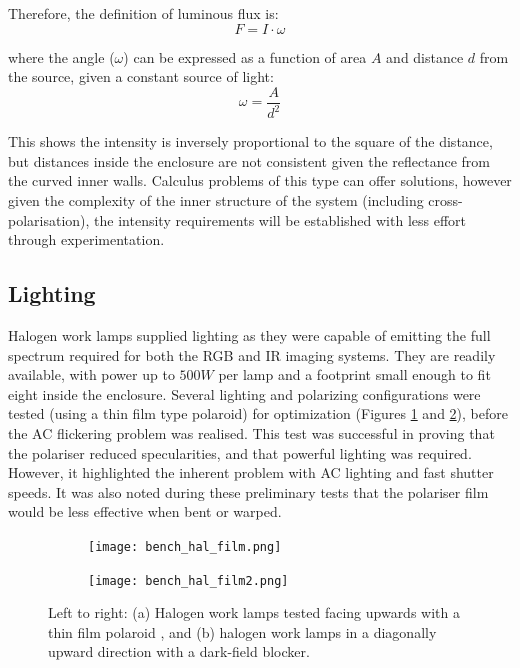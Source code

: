 \documentclass[fleqn,twoside,12pt]{report}
\begin{document}
Therefore, the definition of luminous flux is:
\begin{equation}
	F = I\cdot\omega
\end{equation}

where the angle ($\omega$) can be expressed as a function of area $A$ and distance $d$ from the source, given a constant source of light:
\begin{equation}
	\omega = \frac{A}{d^2}
\end{equation}

This shows the intensity is inversely proportional to the square of the distance, but distances inside the enclosure are not consistent given the reflectance from the curved inner walls. Calculus problems of this type can offer solutions, however given the complexity of the inner structure of the system (including cross-polarisation), the intensity requirements will be established with less effort through experimentation. 




\subsection{Lighting}
\label{sec:lighting}

Halogen work lamps supplied lighting as they were capable of emitting the full spectrum required for both the RGB and IR imaging systems. They are readily available, with power up to $500W$ per lamp and a footprint small enough to fit eight inside the enclosure. Several lighting and polarizing configurations were tested (using a thin film type polaroid) for optimization (Figures \ref{fig:bench_hal_film} and \ref{fig:bench_hal_film2}), before the AC flickering problem was realised. This test was successful in proving that the polariser reduced specularities, and that powerful lighting was required. However, it highlighted the inherent problem with AC lighting and fast shutter speeds. It was also noted during these preliminary tests that the polariser film would be less effective when bent or warped. 


\begin{figure}[h]
	\centering
	\begin{subfigure}{.45\textwidth}
		\centering
		\texttt{[image: bench\_hal\_film.png]}
		\caption{}
		\label{fig:bench_hal_film}
	\end{subfigure}%
	\begin{subfigure}{.45\textwidth}
		\centering
		\texttt{[image: bench\_hal\_film2.png]}
		\caption{}
		\label{fig:bench_hal_film2}
	\end{subfigure}%
	\caption{Left to right: (a) Halogen work lamps tested facing upwards with a thin film polaroid , and (b) halogen work lamps in a diagonally upward direction with a dark-field blocker.}
	\label{fig:test3}
\end{figure}
\end{document}
